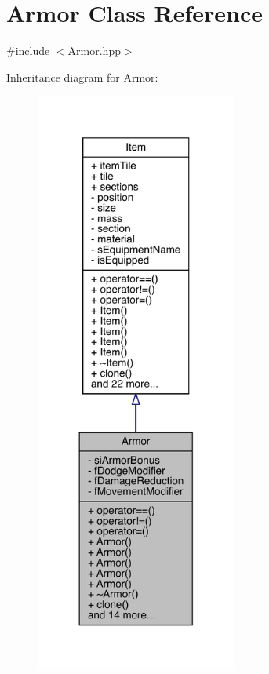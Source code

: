 \hypertarget{class_armor}{}\section{Armor Class Reference}
\label{class_armor}


{\ttfamily \#include $<$Armor.\+hpp$>$}



Inheritance diagram for Armor\+:
\nopagebreak
\begin{figure}[H]
\begin{center}
\leavevmode
\includegraphics[width=188pt]{class_armor__inherit__graph}
\end{center}
\end{figure}



